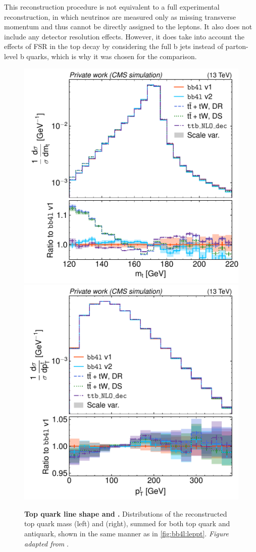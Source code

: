 This reconstruction procedure is not equivalent to a full experimental reconstruction, in which neutrinos are measured only as missing transverse momentum and thus cannot be directly assigned to the leptons. It also does not include any detector resolution effects. However, it does take into account the effects of FSR in the top decay by considering the full b jets instead of parton-level b quarks, which is why it was chosen for the comparison.

\begin{figure}[tp]
    \centering
    \includegraphics[width=0.49 \textwidth]{figures/bb4l/generators/MC_TTBAR_DILEP_SPINDENSITY_anytop_mass.pdf}
    \hfill
    \includegraphics[width=0.49 \textwidth]{figures/bb4l/generators/MC_TTBAR_DILEP_SPINDENSITY_anytop_pt.pdf}
    \caption{\textbf{Top quark line shape and \pt.} Distributions of the reconstructed top quark mass (left) and \pt (right), summed for both top quark and antiquark, shown in the same manner as in \cref{fig:bb4l:leppt}. \textit{Figure adapted from }.}
    \label{fig:bb4l:top}
\end{figure}

